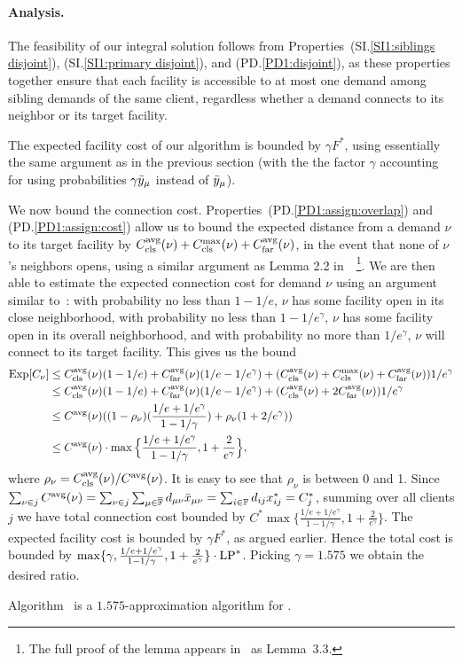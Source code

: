 
\paragraph{Analysis.}
The feasibility of our integral solution follows from
Properties~(SI.\ref{SI1:siblings disjoint}), (SI.\ref{SI1:primary
  disjoint}), and (PD.\ref{PD1:disjoint}), as these properties together
ensure that each facility is accessible to at most one demand among
sibling demands of the same client, regardless whether a demand
connects to its neighbor or its target facility.

The expected facility cost of our algorithm is bounded by
$\gamma F^\ast$, using essentially the same argument as in
the previous section (with the the factor $\gamma$
accounting for using probabilities $\gamma {\bar y}_{\mu}$
instead of ${\bar y}_{\mu}$).

We now bound the connection
cost. Properties~(PD.\ref{PD1:assign:overlap}) and
(PD.\ref{PD1:assign:cost}) allow us to bound the expected
distance from a demand $\nu$ to its target facility by
$C_{\text{cls}}^{{\mbox{\scriptsize\rm avg}}}(\nu)+C_{\text{cls}}^{\max}(\nu)+C_{\text{far}}^{{\mbox{\scriptsize\rm avg}}}(\nu)$, in the event
that none of $\nu$'s neighbors opens, using a similar
argument as Lemma 2.2 in~\cite{ByrkaGS10}~\footnote{The full
  proof of the lemma appears in~\cite{ByrkaA10} as
  Lemma~3.3.}. We are then able to estimate the expected
connection cost for demand $\nu$ using an argument similar
to~\cite{ByrkaGS10}: with probability
no less than $1-1/e$, $\nu$ has some facility open in its
close neighborhood, with probability no less than
$1-1/e^\gamma$, $\nu$ has some facility open in its overall
neighborhood, and with probability no more than
$1/e^\gamma$, $\nu$ will connect to its target facility.
This gives us the bound
%
\begin{align*}
  \mbox{\rm Exp}[C_{\nu}] &\leq C_{\text{cls}}^{{\mbox{\scriptsize\rm avg}}}(\nu)(1-1/e) +
  C_{\text{far}}^{{\mbox{\scriptsize\rm avg}}}(\nu)(1/e-1/e^\gamma) + (C_{\text{cls}}^{{\mbox{\scriptsize\rm avg}}}(\nu)+C_{\text{cls}}^{\max}(\nu)+C_{\text{far}}^{{\mbox{\scriptsize\rm avg}}}(\nu))1/e^\gamma \\
  &\leq C_{\text{cls}}^{{\mbox{\scriptsize\rm avg}}}(\nu)(1-1/e) +
  C_{\text{far}}^{{\mbox{\scriptsize\rm avg}}}(\nu)(1/e-1/e^\gamma) + (C_{\text{cls}}^{{\mbox{\scriptsize\rm avg}}}(\nu)+2C_{\text{far}}^{{\mbox{\scriptsize\rm avg}}}(\nu))1/e^\gamma\\
  &\leq
  C^{{\mbox{\scriptsize\rm avg}}}(\nu)((1-\rho_{\nu})(\frac{1/e+1/e^\gamma}{1-1/\gamma})
  + \rho_{\nu}(1+2/e^\gamma)) \\
  &\leq C^{{\mbox{\scriptsize\rm avg}}}(\nu) \cdot
  \max\Big\{\frac{1/e+1/e^\gamma}{1-1/\gamma},
  1+\frac{2}{e^\gamma}\Big\},
\end{align*}
%
where $\rho_{\nu}=C_{\text{cls}}^{{\mbox{\scriptsize\rm avg}}}(\nu)/C^{{\mbox{\scriptsize\rm avg}}}(\nu)$. It is easy
to see that $\rho_{\nu}$ is between 0 and 1.
Since $\sum_{\nu\in j} C^{{\mbox{\scriptsize\rm avg}}}(\nu) = \sum_{\nu\in
  j}\sum_{\mu\in\overline{\mathbb{F}}} d_{\mu\nu}{\bar x}_{\mu\nu} =
\sum_{i\in\mathbb{F}} d_{ij}x_{ij}^\ast = C_j^\ast$, summing
over all clients $j$ we have total connection cost bounded
by $C^\ast \max\{\frac{1/e+1/e^\gamma}{1-1/\gamma},
1+\frac{2}{e^\gamma}\}$. The expected facility cost is
bounded by $\gamma F^\ast$, as argued earlier. Hence the
total cost is bounded by $\max\{\gamma,
\frac{1/e+1/e^\gamma}{1-1/\gamma},
1+\frac{2}{e^\gamma}\}\cdot \mbox{\rm LP}^\ast$. Picking
$\gamma=1.575$ we obtain the desired ratio.


\begin{theorem}\label{thm:ebgs}
  Algorithm~{\EBGS} is a $1.575$-approximation algorithm for \FTFP.
\end{theorem}



